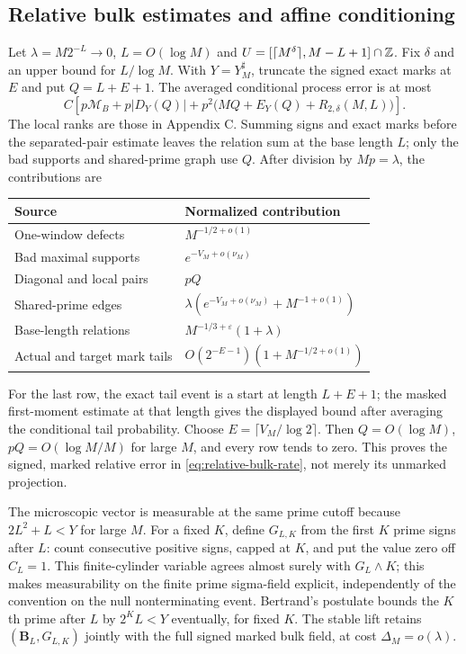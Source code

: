 \subsection{Relative bulk estimates and affine conditioning}
\label{supp:sec:boundary-conditioning}
Let $\lambda=M2^{-L}\to0$, $L=O(\log M)$ and
$U=[\lceil M^\delta\rceil,M-L+1]\cap\mathbb Z$. Fix $\delta$ and an
upper bound for $L/\log M$. With $Y=Y_M^\sharp$, truncate the signed
exact marks at $E$ and put $Q=L+E+1$. The averaged conditional
process error is at most
\[
 C\left[p\mathcal M_B+p|D_Y(Q)|
       +p^2\bigl(MQ+E_Y(Q)+R_{2,\delta}(M,L)\bigr)\right].
\]
The local ranks are those in Appendix C. Summing signs and exact marks
before the separated-pair estimate leaves the relation sum at the base
length $L$; only the bad supports and shared-prime graph use $Q$.
After division by $Mp=\lambda$, the contributions are
\begin{center}\small
\begin{tabularx}{\textwidth}{@{}lX@{}}\toprule
Source & Normalized contribution\\\midrule
One-window defects & $M^{-1/2+o(1)}$\\
Bad maximal supports & $e^{-V_M+o(\nu_M)}$\\
Diagonal and local pairs & $pQ$\\
Shared-prime edges & $\lambda(e^{-V_M+o(\nu_M)}+M^{-1+o(1)})$\\
Base-length relations & $M^{-1/3+\varepsilon}(1+\lambda)$\\
Actual and target mark tails & $O(2^{-E-1})(1+M^{-1/2+o(1)})$\\\bottomrule
\end{tabularx}
\end{center}
For the last row, the exact tail event is a start at length $L+E+1$;
the masked first-moment estimate at that length gives the displayed
bound after averaging the conditional tail probability. Choose
$E=\lceil V_M/\log2\rceil$. Then $Q=O(\log M)$,
$pQ=O(\log M/M)$ for large $M$, and every row tends to zero.
This proves the signed, marked relative error in
\eqref{eq:relative-bulk-rate}, not merely its unmarked projection.

The microscopic vector is measurable at the same prime cutoff because
$2L^2+L<Y$ for large $M$. For a fixed $K$, define $G_{L,K}$ from the
first $K$ prime signs after $L$: count consecutive positive signs, capped
at $K$, and put the value zero off $C_L=1$.
This finite-cylinder variable agrees almost surely with $G_L\wedge K$;
this makes measurability on the finite prime sigma-field explicit,
independently of the convention on the null nonterminating event. Bertrand's postulate bounds the $K$th
prime after $L$ by $2^K L<Y$ eventually, for fixed $K$.
The stable lift retains $(\mathbf B_L,G_{L,K})$ jointly with the full
signed marked bulk field, at cost $\Delta_M=o(\lambda)$.

